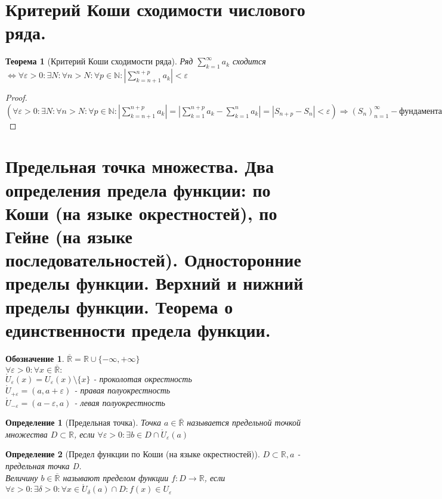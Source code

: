 \documentclass[12pt, a4]{article}
\newtheorem*{theorem}{Теорема}
\newtheorem*{definition}{Определение}
\newtheorem*{notation}{Обозначение}
\renewcommand{\implies}{\Rightarrow}
\renewcommand{\iff}{\Leftrightarrow}
\renewcommand{\epsilon}{\varepsilon}
\newcommand{\R}{\mathbb{R}}
\newcommand{\N}{\mathbb{N}}
\renewcommand{\U}{\mathring{U}}
\begin{document}
\section{Критерий Коши сходимости числового ряда.}

\begin{theorem}[Критерий Коши сходимости ряда]
Ряд $\sum_{k=1}^\infty a_k$ сходится $\iff \forall \epsilon > 0: \exists N: \forall n > N: \forall p \in \N: |\sum_{k=n+1}^{n+p} a_k| < \epsilon$
\end{theorem}

\begin{proof}
$(\forall \epsilon > 0: \exists N: \forall n > N: \forall p \in \N: |\sum_{k=n+1}^{n+p} a_k| = |\sum_{k=1}^{n+p} a_k - \sum_{k=1}^{n} a_k| = |S_{n+p} - S_n| < \epsilon) \implies (S_n)_{n=1}^\infty - фундаментальная \implies (S_n) - сходится$
\end{proof}

\section{Предельная точка множества. Два определения предела функции: по Коши (на языке окрестностей), по Гейне (на языке
последовательностей). Односторонние пределы функции. Верхний и нижний пределы функции. Теорема о единственности
предела функции.}

\begin{notation}
$\overline{\R} = \R \cup \{-\infty, +\infty\}$\\
$\forall \epsilon > 0: \forall x \in \overline{\R}:$\\
$\U_\epsilon(x) = U_\epsilon(x) \setminus \{x\}$ - проколотая окрестность\\
$\U_{+\epsilon} = (a, a + \epsilon)$ - правая полуокрестность\\
$\U_{-\epsilon} = (a - \epsilon, a)$ - левая полуокрестность
\end{notation}

\begin{definition}[Предельная точка]
Точка $a \in \overline{\R}$ называется предельной точкой множества $D \subset \R$, если $\forall \epsilon > 0: \exists b \in D \cap \U_\epsilon(a)$
\end{definition}

\begin{definition}[Предел функции по Коши (на языке окрестностей)]
$D \subset \R, a$ - предельная точка D.\\
Величину $b \in \overline{\R}$ называют пределом функции $f: D \to \R$, если\\
$\forall \epsilon > 0: \exists \delta > 0: \forall x \in \U_\delta(a) \cap D: f(x) \in U_\epsilon$
\end{definition}
\end{document}
